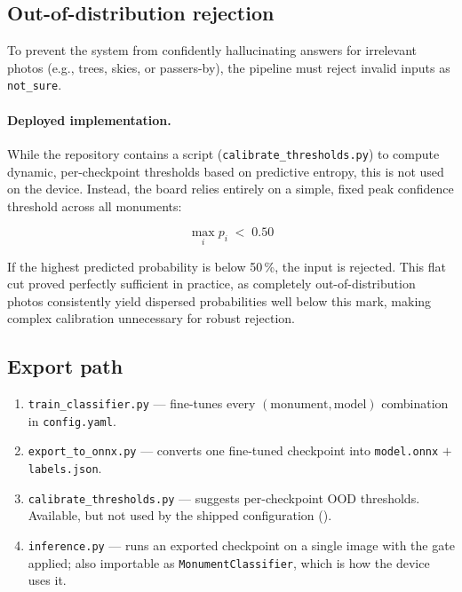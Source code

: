 \documentclass[11pt,a4paper]{article}
\begin{document}
\subsection{Out-of-distribution rejection}
\label{sec:ood}

To prevent the system from confidently hallucinating answers for irrelevant photos (e.g., trees, skies, or passers-by), the pipeline must reject invalid inputs as \texttt{not\_sure}.

\paragraph{Deployed implementation.} While the repository contains a script (\texttt{calibrate\_thresholds.py}) to compute dynamic, per-checkpoint thresholds based on predictive entropy, this is not used on the device. Instead, the board relies entirely on a simple, fixed peak confidence threshold across all monuments:

\begin{equation}
\max_i p_i \;<\; 0.50
\end{equation}

If the highest predicted probability is below 50\,\%, the input is rejected. This flat cut proved perfectly sufficient in practice, as completely out-of-distribution photos consistently yield dispersed probabilities well below this mark, making complex calibration unnecessary for robust rejection.

\subsection{Export path}

\begin{enumerate}
  \item \texttt{train\_classifier.py} --- fine-tunes every
        $(\text{monument}, \text{model})$ combination in \texttt{config.yaml}.
  \item \texttt{export\_to\_onnx.py} --- converts one fine-tuned checkpoint
        into \texttt{model.onnx} $+$ \texttt{labels.json}.
  \item \texttt{calibrate\_thresholds.py} --- suggests per-checkpoint OOD
        thresholds. Available, but not used by the shipped configuration
        ().
  \item \texttt{inference.py} --- runs an exported checkpoint on a single image
        with the gate applied; also importable as \texttt{MonumentClassifier},
        which is how the device uses it.
\end{enumerate}
\end{document}
